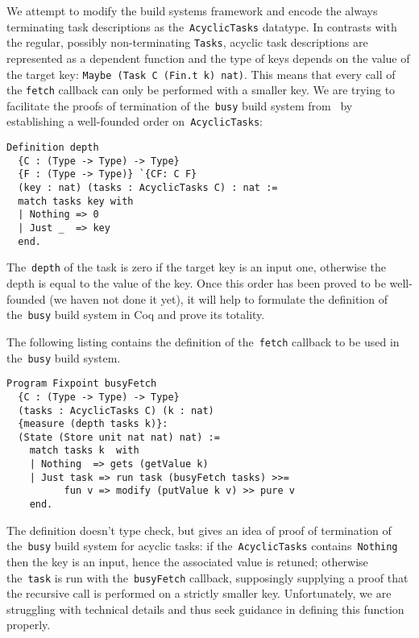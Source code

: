 \documentclass[sigplan,review]{acmart}\settopmatter{printfolios=true,printccs=false,printacmref=false}
\newcommand{\hs}{\texttt}
\begin{document}
We attempt to modify the build systems framework and encode the always terminating
task descriptions as the~\hs{AcyclicTasks} datatype. In contrasts with the regular,
possibly non-terminating \hs{Tasks}, acyclic task descriptions are represented as
a dependent function and the type of keys depends on the value of the target key:
\hs{Maybe (Task C (Fin.t k) nat)}. This means that every call of the \hs{fetch}
callback can only be performed with a smaller key. We are trying to facilitate the
proofs of termination of the~\hs{busy} build system from~\cite{Mokhov2018icfp}
by establishing a well-founded order on~\hs{AcyclicTasks}:

\vspace{-1mm}
\begin{verbatim}
Definition depth
  {C : (Type -> Type) -> Type}
  {F : (Type -> Type)} `{CF: C F}
  (key : nat) (tasks : AcyclicTasks C) : nat :=
  match tasks key with
  | Nothing => 0
  | Just _  => key
  end.
\end{verbatim}

The~\hs{depth} of the task is zero if the target key is an input one, otherwise
the depth is equal to the value of the key. Once this order has been proved to be
well-founded (we haven not done it yet), it will help to formulate the definition
of the~\hs{busy} build system in Coq and prove its totality.

The following listing contains the definition of the~\hs{fetch} callback to be
used in the~\hs{busy} build system.

\vspace{-1mm}
\begin{verbatim}
Program Fixpoint busyFetch
  {C : (Type -> Type) -> Type}
  (tasks : AcyclicTasks C) (k : nat)
  {measure (depth tasks k)}:
  (State (Store unit nat nat) nat) :=
    match tasks k  with
    | Nothing  => gets (getValue k)
    | Just task => run task (busyFetch tasks) >>=
          fun v => modify (putValue k v) >> pure v
    end.
\end{verbatim}
\vspace{-1mm}

The definition doesn't type check, but gives
an idea of proof of termination of the~\hs{busy} build system for acyclic tasks:
if the~\hs{AcyclicTasks} contains~\hs{Nothing} then the key is an input, hence the
associated value is retuned; otherwise the~\hs{task} is run with the~\hs{busyFetch}
callback, supposingly supplying a proof that the recursive call is performed on a
strictly smaller key. Unfortunately, we are struggling with technical details and
thus seek guidance in defining this function properly.
\end{document}
